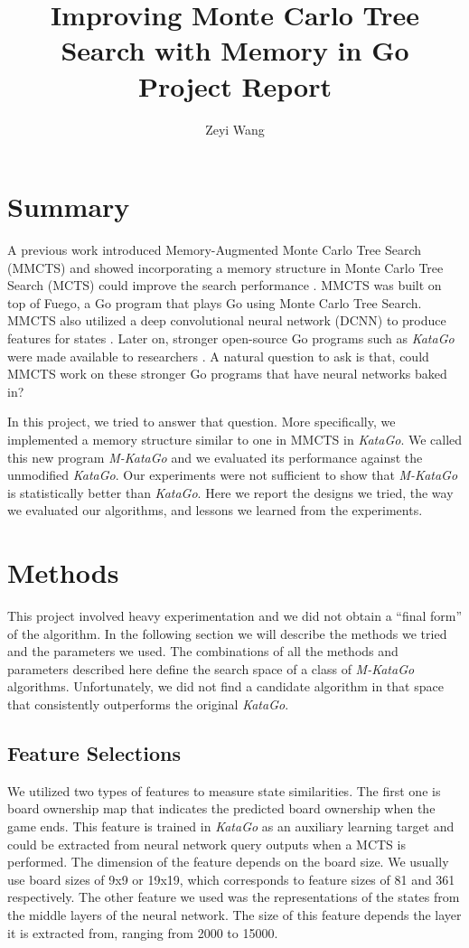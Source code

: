\documentclass{article}
\title{
Improving Monte Carlo Tree Search with Memory in Go \\
Project Report
}
\author{Zeyi Wang}
\newcommand{\katago}{\emph{KataGo}\xspace}
\newcommand{\mkatago}{\emph{M-KataGo}\xspace}
\begin{document}
\maketitle

\section{Summary}
A previous work introduced Memory-Augmented Monte Carlo Tree Search (MMCTS) and showed incorporating a memory structure in Monte Carlo Tree Search (MCTS) could improve the search performance \cite{xiao:mmcts}.
MMCTS was built on top of Fuego, a Go program that plays Go using Monte Carlo Tree Search.
MMCTS also utilized a deep convolutional neural network (DCNN) to produce features for states \cite{clark:go}.
Later on, stronger open-source Go programs such as \katago were made available to researchers \cite{wu:go}.
A natural question to ask is that, could MMCTS work on these stronger Go programs that have neural networks baked in?

In this project, we tried to answer that question.
More specifically, we implemented a memory structure similar to one in MMCTS in \katago.
We called this new program \mkatago and we evaluated its performance against the unmodified \katago.
Our experiments were not sufficient to show that \mkatago is statistically better than \katago.
Here we report the designs we tried, the way we evaluated our algorithms, and lessons we learned from the experiments.

\section{Methods}
This project involved heavy experimentation and we did not obtain a ``final form'' of the algorithm.
In the following section we will describe the methods we tried and the parameters we used.
The combinations of all the methods and parameters described here define the search space of a class of \mkatago algorithms.
Unfortunately, we did not find a candidate algorithm in that space that consistently outperforms the original \katago.

\subsection{Feature Selections}
We utilized two types of features to measure state similarities.
The first one is board ownership map that indicates the predicted board ownership when the game ends.
This feature is trained in \katago as an auxiliary learning target and could be extracted from neural network query outputs when a MCTS is performed.
The dimension of the feature depends on the board size.
We usually use board sizes of 9x9 or 19x19, which corresponds to feature sizes of 81 and 361 respectively.
The other feature we used was the representations of the states from the middle layers of the neural network.
The size of this feature depends the layer it is extracted from, ranging from 2000 to 15000.
\end{document}
